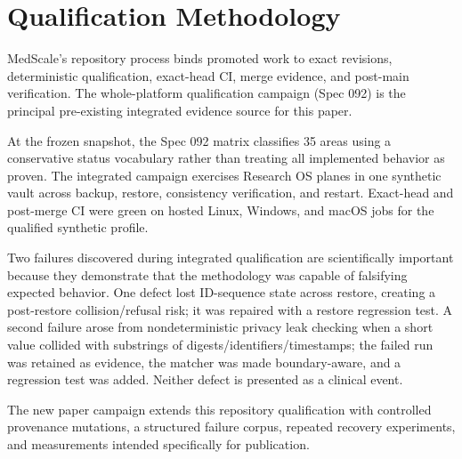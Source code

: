 \section{Qualification Methodology}

MedScale's repository process binds promoted work to exact revisions, deterministic qualification, exact-head CI, merge evidence, and post-main verification. The whole-platform qualification campaign (Spec 092) is the principal pre-existing integrated evidence source for this paper.

At the frozen snapshot, the Spec 092 matrix classifies 35 areas using a conservative status vocabulary rather than treating all implemented behavior as proven. The integrated campaign exercises Research OS planes in one synthetic vault across backup, restore, consistency verification, and restart. Exact-head and post-merge CI were green on hosted Linux, Windows, and macOS jobs for the qualified synthetic profile.

Two failures discovered during integrated qualification are scientifically important because they demonstrate that the methodology was capable of falsifying expected behavior. One defect lost ID-sequence state across restore, creating a post-restore collision/refusal risk; it was repaired with a restore regression test. A second failure arose from nondeterministic privacy leak checking when a short value collided with substrings of digests/identifiers/timestamps; the failed run was retained as evidence, the matcher was made boundary-aware, and a regression test was added. Neither defect is presented as a clinical event.

The new paper campaign extends this repository qualification with controlled provenance mutations, a structured failure corpus, repeated recovery experiments, and measurements intended specifically for publication.
